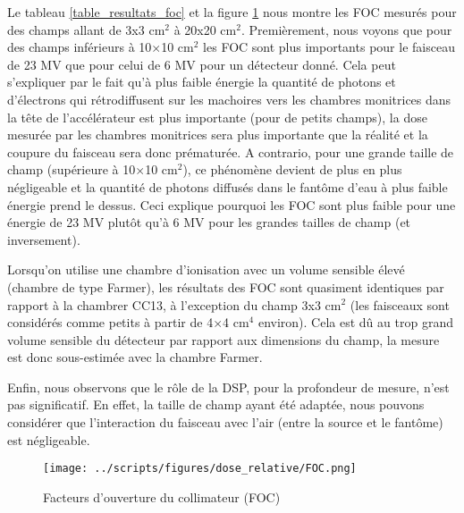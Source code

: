 \documentclass{book}
\begin{document}
Le tableau \ref*{table_resultats_foc} et la figure \ref*{fig_foc} nous montre les FOC mesurés pour des champs allant de 3x3 cm$^2$ à 20x20 cm$^2$. Premièrement, nous voyons que pour des champs inférieurs à 10$\times$10 cm$^2$ les FOC sont plus importants pour le faisceau de 23 MV que pour celui de 6 MV pour un détecteur donné. Cela peut s'expliquer par le fait qu'à plus faible énergie la quantité de photons et d'électrons qui rétrodiffusent sur les machoires vers les chambres monitrices dans la tête de l'accélérateur est plus importante (pour de petits champs), la dose mesurée par les chambres monitrices sera plus importante que la réalité et la coupure du faisceau sera donc prématurée. A contrario, pour une grande taille de champ (supérieure à 10$\times$10 cm$^2$), ce phénomène devient de plus en plus négligeable et la quantité de photons diffusés dans le fantôme d'eau à plus faible énergie prend le dessus. Ceci explique pourquoi les FOC sont plus faible pour une énergie de 23 MV plutôt qu'à 6 MV pour les grandes tailles de champ (et inversement).

Lorsqu'on utilise une chambre d'ionisation avec un volume sensible élevé (chambre de type Farmer), les résultats des FOC sont quasiment identiques par rapport à la chambrer CC13, à l'exception du champ 3x3 cm$^2$ (les faisceaux sont considérés comme petits à partir de 4$\times$4 cm$^4$ environ). Cela est dû au trop grand volume sensible du détecteur par rapport aux dimensions du champ, la mesure est donc sous-estimée avec la chambre Farmer.

Enfin,  nous observons que le rôle de la DSP, pour la profondeur de mesure, n'est pas significatif. En effet, la taille de champ ayant été adaptée, nous pouvons considérer que l'interaction du faisceau avec l'air (entre la source et le fantôme) est négligeable.

\begin{figure}[h]
  \centering
  \texttt{[image: ../scripts/figures/dose\_relative/FOC.png]}
  \caption{Facteurs d'ouverture du collimateur (FOC)}
  \label{fig_foc}
\end{figure}
\end{document}
